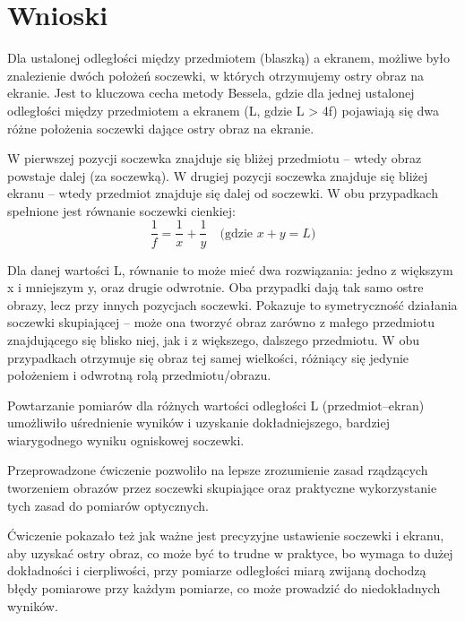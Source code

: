 \documentclass[12pt]{article}
\begin{document}
\section*{Wnioski}
Dla ustalonej odległości między przedmiotem (blaszką) a ekranem, możliwe było znalezienie dwóch położeń 
soczewki, w których otrzymujemy ostry obraz na ekranie. Jest to kluczowa cecha metody Bessela, gdzie 
dla jednej ustalonej odległości między przedmiotem a ekranem (L, gdzie L > 4f) pojawiają się dwa różne 
położenia soczewki dające ostry obraz na ekranie.

W pierwszej pozycji soczewka znajduje się bliżej przedmiotu -- wtedy obraz powstaje dalej (za soczewką). 
W drugiej pozycji soczewka znajduje się bliżej ekranu -- wtedy przedmiot znajduje się dalej od soczewki. 
W obu przypadkach spełnione jest równanie soczewki cienkiej:
\[
    \frac{1}{f} = \frac{1}{x} + \frac{1}{y} \quad \text{(gdzie } x + y = L\text{)}
\]

Dla danej wartości L, równanie to może mieć dwa rozwiązania: jedno z większym x i mniejszym y, 
oraz drugie odwrotnie. Oba przypadki dają tak samo ostre obrazy, lecz przy innych pozycjach soczewki. 
Pokazuje to symetryczność działania soczewki skupiającej -- może ona tworzyć obraz zarówno z małego 
przedmiotu znajdującego się blisko niej, jak i z większego, dalszego przedmiotu. W obu przypadkach 
otrzymuje się obraz tej samej wielkości, różniący się jedynie położeniem i odwrotną rolą przedmiotu/obrazu.

Powtarzanie pomiarów dla różnych wartości odległości L (przedmiot--ekran) umożliwiło uśrednienie wyników 
i uzyskanie dokładniejszego, bardziej wiarygodnego wyniku ogniskowej soczewki.

Przeprowadzone ćwiczenie pozwoliło na lepsze zrozumienie zasad rządzących tworzeniem obrazów przez 
soczewki skupiające oraz praktyczne wykorzystanie tych zasad do pomiarów optycznych.

Ćwiczenie pokazało też jak ważne jest precyzyjne ustawienie soczewki i ekranu, aby uzyskać ostry obraz,
co może być to trudne w praktyce, bo wymaga to dużej dokładności i cierpliwości, przy pomiarze odległości
miarą zwijaną dochodzą błędy pomiarowe przy każdym pomiarze, co może prowadzić do niedokładnych wyników.
\end{document}
